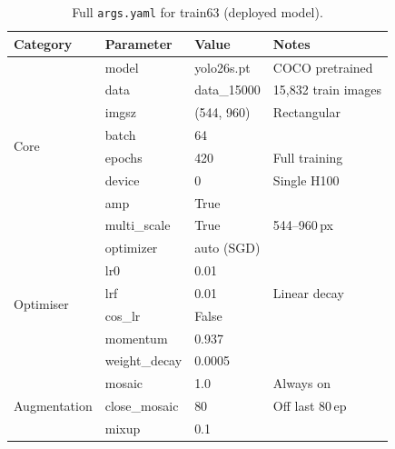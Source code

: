 \documentclass[12pt, titlepage]{article}
\begin{document}
\begin{table}[H]
  \centering
  \caption{Full \texttt{args.yaml} for train63 (deployed model).}
  \label{tab:full_hyper}
  \footnotesize
  \begin{tabular}{@{}llll@{}}
    \toprule
    \textbf{Category} & \textbf{Parameter} & \textbf{Value} & \textbf{Notes}        \\
    \midrule
    \multirow{8}{*}{Core}
                      & model              & yolo26s.pt     & COCO pretrained       \\
                      & data               & data\_15000    & 15{,}832 train images \\
                      & imgsz              & (544, 960)     & Rectangular           \\
                      & batch              & 64             &                       \\
                      & epochs             & 420            & Full training         \\
                      & device             & 0              & Single H100           \\
                      & amp                & True           &                       \\
                      & multi\_scale       & True           & 544--960\,px          \\
    \midrule
    \multirow{6}{*}{Optimiser}
                      & optimizer          & auto (SGD)     &                       \\
                      & lr0                & 0.01           &                       \\
                      & lrf                & 0.01           & Linear decay          \\
                      & cos\_lr            & False          &                       \\
                      & momentum           & 0.937          &                       \\
                      & weight\_decay      & 0.0005         &                       \\
    \midrule
    \multirow{6}{*}{Augmentation}
                      & mosaic             & 1.0            & Always on             \\
                      & close\_mosaic      & 80             & Off last 80\,ep       \\
                      & mixup              & 0.1            &                       \\

\end{tabular}
\end{table}
\end{document}
